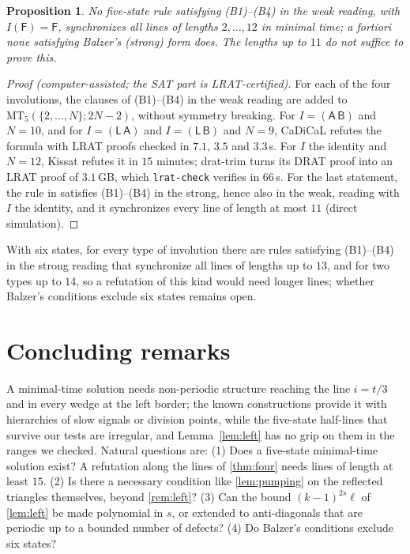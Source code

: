 \documentclass[3p]{elsarticle}
\newtheorem{proposition}[theorem]{Proposition}
\theoremstyle{remark}
\begin{document}
\begin{proposition}\label{prop:balzer}
No five-state rule satisfying (B1)--(B4) in the weak reading, with $I(\mathsf
F)=\mathsf F$, synchronizes all lines of lengths $2,\dots,12$ in minimal time;
a fortiori none satisfying Balzer's (strong) form does. The lengths up to $11$
do not suffice to prove this.
\end{proposition}

\begin{proof}[Proof (computer-assisted; the SAT part is LRAT-certified)]
For each of the four involutions, the clauses of (B1)--(B4) in the weak reading
are added to $\mathrm{MT}_5(\{2,\dots,N\};2N-2)$, without symmetry breaking.
For $I=(\mathsf A\,\mathsf B)$ and $N=10$, and for $I=(\mathsf L\,\mathsf A)$
and $I=(\mathsf L\,\mathsf B)$ and $N=9$, CaDiCaL refutes the formula with LRAT
proofs checked in $7.1$, $3.5$ and $3.3$\,s. For $I$ the identity and $N=12$,
Kissat refutes it in $15$ minutes; \textsf{drat-trim} turns its DRAT proof into
an LRAT proof of $3.1$\,GB, which \texttt{lrat-check} verifies in $66$\,s. For
the last statement, the rule in  satisfies
(B1)--(B4) in the strong, hence also in the weak, reading with $I$ the
identity, and it synchronizes every line of length at most $11$ (direct
simulation).
\end{proof}

With six states, for every type of involution there are rules satisfying
(B1)--(B4) in the strong reading that synchronize all lines of lengths up to
$13$, and for two types up to $14$, so a refutation of this kind would need longer lines; whether
Balzer's conditions exclude six states remains open.

\section{Concluding remarks}\label{sec:conclusion}

A minimal-time solution needs non-periodic structure reaching the line
$i=t/3$ and in every wedge at the left border; the known constructions provide
it with hierarchies of slow signals or division points, while the five-state
half-lines that survive our tests are irregular, and Lemma~\ref{lem:left} has no
grip on them in the ranges we checked. Natural questions are: (1) Does a
five-state minimal-time solution exist? A refutation along the lines of
\cref{thm:four} needs lines of length at least $15$. (2) Is there a necessary
condition like \cref{lem:pumping} on the reflected triangles themselves,
beyond \cref{rem:left}? (3) Can the bound $(k-1)^{2s}\ell$ of \cref{lem:left}
be made polynomial in $s$, or extended to anti-diagonals that are periodic up
to a bounded number of defects? (4) Do Balzer's conditions exclude six states?
\end{document}
